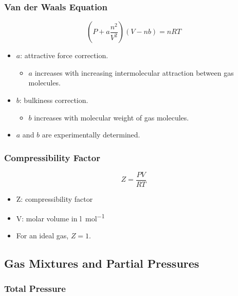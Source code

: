 \documentclass{article}
\begin{document}
\subsubsection{Van der Waals Equation}

\begin{equation*}
    \left(P + a\frac{n^2}{V^2}\right)(V - nb) = nRT
\end{equation*}

\begin{itemize}
    \item $a$: attractive force correction.
    \begin{itemize}
        \item $a$ increases with increasing intermolecular attraction between gas molecules.
    \end{itemize}
    \item $b$: bulkiness correction.
    \begin{itemize}
        \item $b$ increases with molecular weight of gas molecules.
    \end{itemize}
    \item $a$ and $b$ are experimentally determined.
\end{itemize}

\subsubsection{Compressibility Factor}

\begin{equation*}
    Z = \frac{PV}{RT}
\end{equation*}

\begin{itemize}
    \item Z: compressibility factor
    \item V: molar volume in \si[per-mode = fraction]{\litre\per\mole}
    \item For an ideal gas, $Z = 1$.
\end{itemize}

\subsection{Gas Mixtures and Partial Pressures}

\subsubsection{Total Pressure}
\end{document}
